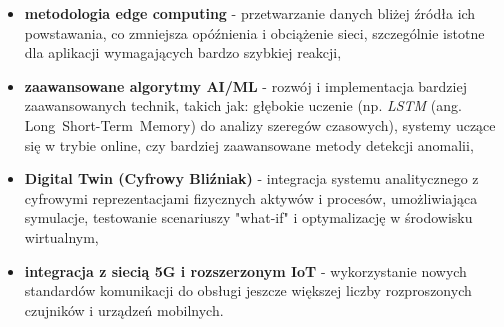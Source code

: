 \begin{itemize}
    \item \textbf{metodologia edge computing} - przetwarzanie danych bliżej źródła ich powstawania, co zmniejsza opóźnienia i obciążenie sieci, szczególnie istotne dla aplikacji wymagających bardzo szybkiej reakcji,
    \item \textbf{zaawansowane algorytmy AI/ML} - rozwój i implementacja bardziej zaawansowanych technik, takich jak: głębokie uczenie (np. \textit{LSTM} (ang. \mbox{Long Short-Term Memory}) do analizy szeregów czasowych), systemy uczące się w trybie online, czy bardziej zaawansowane metody detekcji anomalii,
    \item \textbf{Digital Twin (Cyfrowy Bliźniak)} - integracja systemu analitycznego z cyfrowymi reprezentacjami fizycznych aktywów i procesów, umożliwiająca symulacje, testowanie scenariuszy "what-if" i optymalizację w środowisku wirtualnym,
    \item \textbf{integracja z siecią 5G i rozszerzonym IoT} - wykorzystanie nowych standardów komunikacji do obsługi jeszcze większej liczby rozproszonych czujników i urządzeń mobilnych.
\end{itemize}